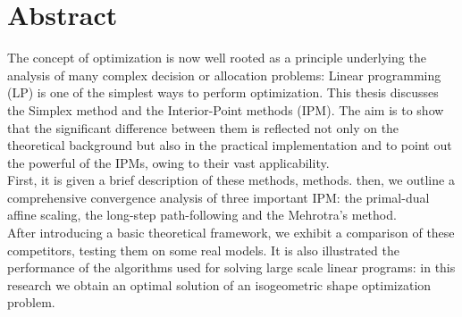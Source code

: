 \documentclass[a4paper,10 pt,titlepage,twoside]{book}
\theoremstyle{plain}
\theoremstyle{definition}
\theoremstyle{remark}
\begin{document}
\chapter*{Abstract}
The concept of optimization is now well rooted as a principle underlying the analysis
of many complex decision or allocation problems: Linear programming (LP) is one of the simplest ways to perform optimization.
This thesis discusses the Simplex method and the Interior-Point methods (IPM).
The aim is to show that the significant difference between them is reflected not only on the theoretical background but also in the practical implementation and to point out the powerful of the IPMs, owing to their vast applicability.\\
First, it is given a brief description of these methods,
methods. 
then, we outline a comprehensive convergence analysis of three important IPM: the primal-dual affine scaling, the long-step path-following and the Mehrotra's method. \\
After introducing a basic theoretical framework, we exhibit a comparison of these competitors, testing them on some real models.
It is also illustrated the performance of the algorithms used for solving large scale linear programs: in this research we obtain an optimal solution of an isogeometric shape optimization problem.\\

\end{document}
